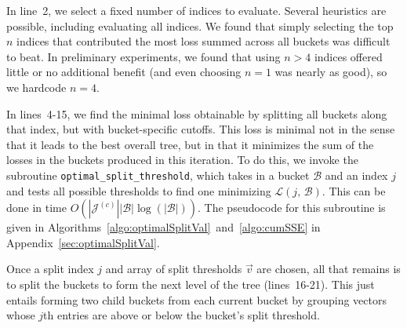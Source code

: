 In line~2, we select a fixed number of indices to evaluate. Several heuristics are possible, including evaluating all indices. We found that simply selecting the top $n$ indices that contributed the most loss summed across all buckets was difficult to beat. In preliminary experiments, we found that using $n > 4$ indices offered little or no additional benefit (and even choosing $n = 1$ was nearly as good), so we hardcode $n = 4$.

In lines~4-15, we find the minimal loss obtainable by splitting all buckets along that index, but with bucket-specific cutoffs. This loss is minimal not in the sense that it leads to the best overall tree, but in that it minimizes the sum of the losses in the buckets produced in this iteration. To do this, we invoke the subroutine \texttt{optimal\_split\_threshold}, which takes in a bucket $\mathcal{B}$ and an index $j$ and tests all possible thresholds to find one minimizing $\mathcal{L}(j \text{, } \mathcal{B})$. This can be done in time $O(|\mathcal{J}^{(c)}||\mathcal{B}| \log(|\mathcal{B}|))$. The pseudocode for this subroutine is given in Algorithms~\ref{algo:optimalSplitVal}~and~\ref{algo:cumSSE} in Appendix~\ref{sec:optimalSplitVal}.

Once a split index $j$ and array of split thresholds $\vec{v}$ are chosen, all that remains is to split the buckets to form the next level of the tree (lines~16-21). This just entails forming two child buckets from each current bucket by grouping vectors whose $j$th entries are above or below the bucket's split threshold.%


